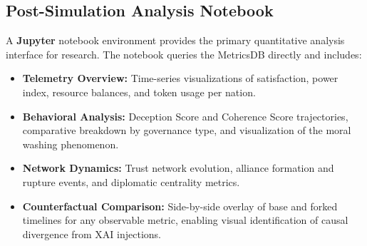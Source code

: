 \subsection{Post-Simulation Analysis Notebook}
A \textbf{Jupyter} notebook environment provides the primary quantitative analysis interface for research. The notebook queries the MetricsDB directly and includes:
\begin{itemize}
    \item \textbf{Telemetry Overview:} Time-series visualizations of satisfaction, power index, resource balances, and token usage per nation.
    \item \textbf{Behavioral Analysis:} Deception Score and Coherence Score trajectories, comparative breakdown by governance type, and visualization of the moral washing phenomenon.
    \item \textbf{Network Dynamics:} Trust network evolution, alliance formation and rupture events, and diplomatic centrality metrics.
    \item \textbf{Counterfactual Comparison:} Side-by-side overlay of base and forked timelines for any observable metric, enabling visual identification of causal divergence from XAI injections.
\end{itemize}

